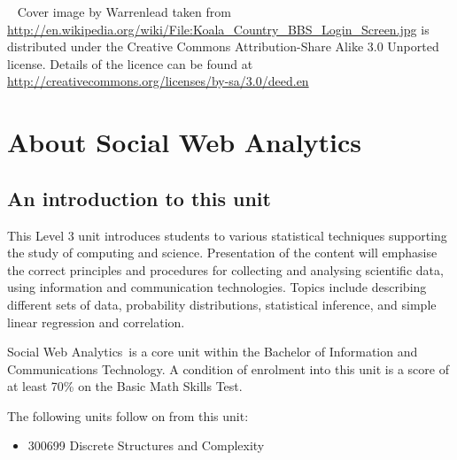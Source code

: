 \documentclass[a4paper,oneside]{book}
\newcommand{\unitname}{Social Web Analytics}
\begin{document}
~
\vfill
\noindent
Cover image by Warrenlead taken from
\url{http://en.wikipedia.org/wiki/File:Koala_Country_BBS_Login_Screen.jpg}
is distributed under the Creative Commons Attribution-Share Alike 3.0 Unported 
license. Details of the licence can be found at
\url{http://creativecommons.org/licenses/by-sa/3.0/deed.en}

\newpage

\tableofcontents

\chapter{About \unitname}

\section{An introduction to this unit}


This Level 3 unit introduces students to various statistical
techniques supporting the study of computing and science. Presentation
of the content will emphasise the correct principles and procedures
for collecting and analysing scientific data, using information and
communication technologies. Topics include describing different sets
of data, probability distributions, statistical inference, and simple
linear regression and correlation.


\unitname~is a core unit within the Bachelor of Information and
Communications Technology. A condition of enrolment into this unit is
a score of at least 70\% on the Basic Math Skills Test.

The following units follow on from this unit: 
\begin{itemize}
\item 300699 Discrete Structures and Complexity
\end{itemize}






\end{document}
